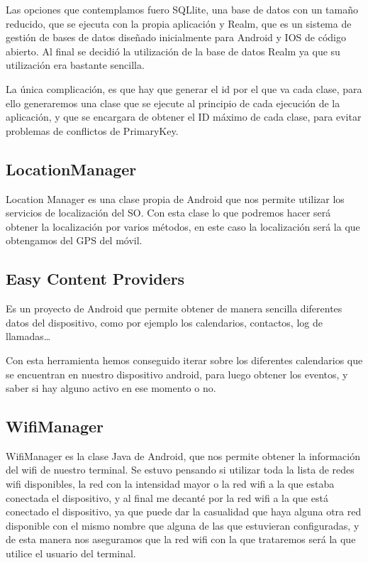 Las opciones que contemplamos fuero SQLlite, una base de datos con un tamaño reducido, que se ejecuta con la propia aplicación y Realm, que es un sistema de gestión de bases de datos diseñado inicialmente para Android y IOS de código abierto.
Al final se decidió la utilización de la base de datos Realm ya que su utilización era bastante sencilla.

La única complicación, es que hay que generar el id por el que va cada clase, para ello generaremos una clase que se ejecute al principio de cada ejecución de la aplicación, y que se encargara de obtener el ID máximo de cada clase, para evitar problemas de conflictos de PrimaryKey.

\subsection{LocationManager}
Location Manager es una clase propia de Android que nos permite utilizar los servicios de localización del SO. Con esta clase lo que podremos hacer será obtener la localización por varios métodos, en este caso la localización será la que obtengamos del GPS del móvil. 

\subsection{Easy Content Providers}

Es un proyecto de Android que permite obtener de manera sencilla diferentes datos del dispositivo, como por ejemplo los calendarios, contactos, log de llamadas\ldots

Con esta herramienta hemos conseguido iterar sobre los diferentes calendarios que se encuentran en nuestro dispositivo android, para luego obtener los eventos, y saber si hay alguno activo en ese momento o no.

\subsection{WifiManager}
WifiManager es la clase Java de Android, que nos permite obtener la información del wifi de nuestro terminal. Se estuvo pensando si utilizar toda la lista de redes wifi disponibles, la red con la intensidad mayor o la red wifi a la que estaba conectada el dispositivo, y al final me decanté por la red wifi a la que está conectado el dispositivo, ya que puede dar la casualidad que haya alguna otra red disponible con el mismo nombre que alguna de las que estuvieran configuradas, y de esta manera nos aseguramos que la red wifi con la que trataremos será la que utilice el usuario del terminal.

